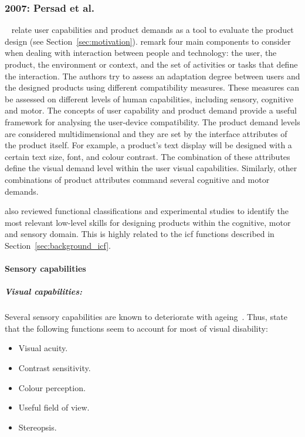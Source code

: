 
\subsubsection{2007: Persad et al.}
\label{sec:persad}

\citet{persad_cognitive_2007}~\citep{persad_characterising_2007} relate user
capabilities and product demands as a tool to evaluate the product design (see Section~\ref{sec:motivation}).
\citeauthor{persad_characterising_2007} remark four main components to consider 
when dealing with interaction between people and technology: the user, the 
product, the environment or context, and the set of activities or tasks 
that define the interaction. The authors try to assess an adaptation degree 
between users and the designed products using different compatibility measures. 
These measures can be assessed on different levels of human capabilities, 
including sensory, cognitive and motor. The concepts of user capability and 
product demand provide a useful framework for analysing the user-device 
compatibility. The product demand levels are considered multidimensional and 
they are set by the interface attributes of the product itself. For example, 
a product's text display will be designed with a certain text size, font, and 
colour contrast. The combination of these attributes define the visual demand 
level within the user visual capabilities. Similarly, other combinations of 
product attributes command several cognitive and motor demands. 

\citeauthor{persad_cognitive_2007} also reviewed functional classifications 
and experimental studies to identify the most relevant low-level skills for 
designing products within the cognitive, motor and sensory domain. This is 
highly related to the \ac{icf} functions described in Section~\ref{sec:background_icf}.

\paragraph*{Sensory capabilities}
\subparagraph*{Visual capabilities:} Several sensory capabilities are known to 
deteriorate with ageing~\citep{persad_exploring_2006}. Thus, 
\citeauthor{persad_exploring_2006} state that the following functions seem to 
account for most of visual disability:

\begin{itemize}
  \item Visual acuity.
  \item Contrast sensitivity.
  \item Colour perception.
  \item Useful field of view.
  \item Stereopsis.
\end{itemize}


